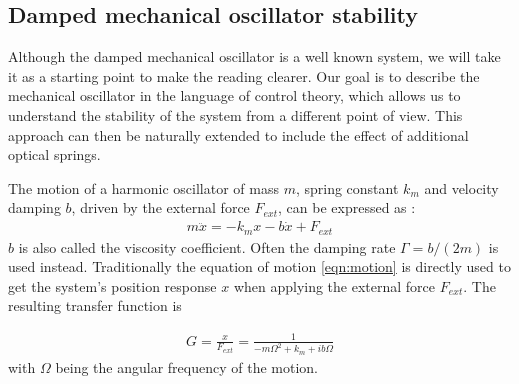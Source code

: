 \documentclass[%
 reprint,
 amsmath,amssymb,
 aps,
]{revtex4-1}
\begin{document}

\subsection{Damped mechanical oscillator stability}

Although the damped mechanical oscillator is a well known system, we will take it as a starting point to make the reading clearer. Our goal is to describe the mechanical oscillator in the language of control theory, which allows us to understand the stability of the system from a different point of view. This approach can then be naturally extended to include the effect of additional optical springs. 

The motion of a harmonic oscillator of mass $m$, spring constant $k_m$ and velocity damping $b$, driven by the external force $F_{ext}$, can be expressed as \cite{Saulson90}:
\begin{eqnarray}
\label{eqn:motion}
m\ddot{x}=-k_m x-b\dot{x}+F_{ext}
\end{eqnarray}
$b$ is also called the viscosity coefficient. Often the damping rate $\Gamma=b/(2 m)$ is used instead.
Traditionally the equation of motion \ref{eqn:motion} is directly used to get the system's position response $x$ when applying the external force $F_{ext}$. The resulting transfer function is

\begin{eqnarray}
\label{eqn:TF}
G=\frac{x}{F_{ext}}=\frac{1}{-m\Omega^2+k_m+ib\Omega}                                                 %
\end{eqnarray}
with $\Omega$ being the angular frequency of the motion.
\end{document}
